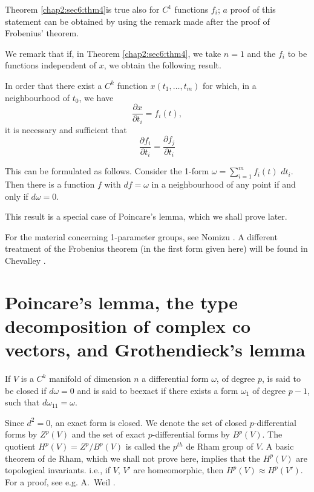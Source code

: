 \begin{remark*}
Theorem \ref{chap2:sec6:thm4}\pageoriginale is true also for $C^1$ functions $f_i$; $a$ proof of this
  statement can be obtained by using the remark made after the proof
  of Frobenius' theorem. 
\end{remark*}

We remark that if, in Theorem \ref{chap2:sec6:thm4}, we take $n=1$ and
the $f_i$ to be 
functions independent of $x$, we obtain the following result. 

In order that there exist a $C^k$ function $x(t_1, \ldots, t_m)$ for
which, in a neighbourhood of $t_0$, we have 
$$
\frac{\partial x}{\partial t_i} = f_i(t),
$$
it is necessary and sufficient that 
$$
\frac{\partial f_i}{\partial t_i} = \frac{\partial f_j}{\partial t_i}
$$

This can be formulated as follows. Consider the 1-form $\omega = \sum
\limits^m_{i=1} f_i(t)$ $dt_i$. Then there is a function $f$ with
$df=\omega$ in a neighbourhood of any point if and only if $d \omega
= 0$.  

This result is a special case of Poincare's lemma, which we shall prove later.

For the material concerning 1-parameter groups, see Nomizu \cite{33}. A
different treatment of the Frobenius theorem (in the first form given
here) will be found in Chevalley \cite{7}. 

\section[Poincare's lemma, the type decomposition...]{Poincare's lemma, the type decomposition of complex
  co vectors, and Grothendieck's lemma}\label{chap2:sec7} %

\begin{defi*}
  If $V$ is a $C^k$ manifold of dimension $n$ a differential form
  $\omega$, of degree $p$, is said to be closed if $d \omega =0$ and
  is said to be\pageoriginale exact if there exists a form $\omega_1$ of degree
  $p-1$, such that $d \omega_{11} = \omega$. 
\end{defi*}

Since $d^2 = 0$, an exact form is closed. We denote the set of closed
$p$-differential forms by $Z^p(V)$ and the set of exact $p$-differential
forms by $B^p(V)$. The quotient $H^p(V) = Z^p / B^p(V)$ is called the
$p^{th}$ de Rham group of $V$. A basic theorem of de Rham, which we
shall not prove here, implies that the $H^p(V)$ are topological
invariants. i.e., if $V$, $V'$ are homeomorphic, then $H^p(V) \approx
H^p(V')$. For a proof, see e.g. A.~Weil \cite{43}. 

